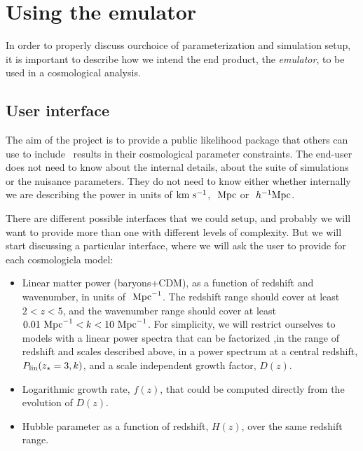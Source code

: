 \section{Using the emulator}

In order to properly discuss ourchoice of parameterization and simulation
setup, it is important to describe how we intend the end product,
the \textit{emulator}, to be used in a cosmological analysis.


\subsection{User interface}

The aim of the project is to provide a public likelihood package that others
can use to include \lya\ results in their cosmological parameter constraints.
The end-user does not need to know about the internal details, about the 
suite of simulations or the nuisance parameters.
They do not need to know either whether internally we are describing the 
power in units of ${\rm km~s^{-1}}$, $\ \text{Mpc}$ or $\ h^{-1}\text{Mpc}$. 

There are different possible interfaces that we could setup, and probably 
we will want to provide more than one with different levels of complexity.
But we will start discussing a particular interface, where we will ask 
the user to provide for each cosmologicla model:
\begin{itemize}
 \item Linear matter power (baryons+CDM), as a function of redshift and 
  wavenumber, in units of $\ \text{Mpc}^{-1}$. 
  The redshift range should cover at least $2 < z < 5$, and the wavenumber
  range should cover at least $0.01 \ \text{Mpc}^{-1} < k < 10 \ \text{Mpc}^{-1}$. 
  For simplicity, we will restrict ourselves to models with a linear power 
  spectra that can be factorized ,in the range of redshift and scales 
  described above, in a power spectrum at a central redshift, 
  $P_{\rm lin}(z_\star=3,k)$, and a scale independent growth factor, $D(z)$.
 \item Logarithmic growth rate, $f(z)$, that could be computed directly
  from the evolution of $D(z)$.
 \item Hubble parameter as a function of redshift, $H(z)$, over the same 
  redshift range.
\end{itemize}

